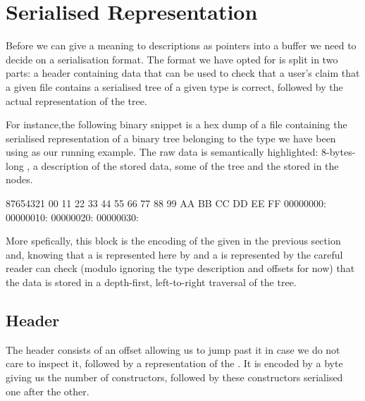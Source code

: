 \section{Serialised Representation}\label{sec:hexdump}

Before we can give a meaning to descriptions as pointers into a buffer we
need to decide on a serialisation format.
%
The format we have opted for is split in two parts: a header containing
data that can be used to check that a user's claim that a given file
contains a serialised tree of a given type is correct, followed by the
actual representation of the tree.


For instance,the following binary snippet is a hex dump of a file
containing the serialised representation of a binary tree belonging to
the type we have been using as our running example.
%
The raw data is semantically highlighted:
8-bytes-long ,
a  description of the stored data,
some  of the tree
and the  stored in the nodes.

\begin{hexdump}
87654321\hphantom{:} 00 11 22 33 44 55 66 77 88 99 AA BB CC DD EE FF
00000000:   
00000010:   
00000020:         
00000030:     
\end{hexdump}

More spefically, this block is the encoding of the 
given in the previous section and,
%
knowing that a  is represented here by 
and a  is represented by 
%
the careful reader can check
(modulo ignoring the type description and offsets for now)
that the data is stored in a depth-first, left-to-right traversal of the tree.


\subsection{Header}

The header consists of an offset allowing us to jump past it in case we do
not care to inspect it, followed by a representation of the .
%
It is encoded by a byte giving us the number of constructors, followed by
these constructors serialised one after the other.

